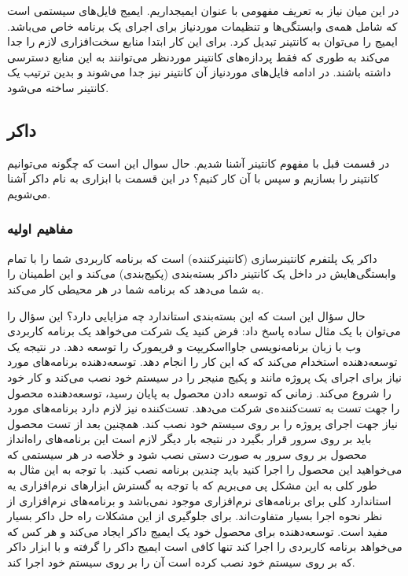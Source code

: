 در این میان نیاز به تعریف مفهومی با عنوان ایمیجداریم. ایمیج فایل‌های سیستمی است که شامل همه‌ی وابستگی‌ها و تنظیمات موردنیاز برای اجرای یک برنامه خاص می‌باشد. ایمیج را می‌توان به کانتینر تبدیل کرد. برای این کار ابتدا
منابع سخت‌افزاری لازم را جدا می‌کند به طوری که فقط پردازه‌های کانتینر موردنظر می‌توانند به این منابع دسترسی داشته باشند. در ادامه فایل‌های موردنیاز آن کانتینر نیز جدا می‌شوند و بدین ترتیب یک کانتینر ساخته می‌شود.


\subsection{داکر}

در قسمت قبل با مفهوم کانتینر آشنا شدیم. حال سوال این است که چگونه می‌توانیم کانتینر را بسازیم و سپس با آن کار کنیم؟ در این قسمت با ابزاری به نام داکر آشنا می‌شویم.

\subsubsection{مفاهیم اولیه}

داکر یک پلتفرم کانتینرسازی (کانتینرکننده) است که برنامه کاربردی شما را با تمام وابستگی‌هایش در داخل یک کانتینر داکر بسته‌بندی (پکیج‌بندی) می‌کند و این اطمینان را به شما می‌دهد که برنامه شما در هر محیطی کار می‌کند.

حال سؤال این است که این بسته‌بندی استاندارد چه مزایایی دارد؟ این سؤال را می‌توان با یک مثال ساده پاسخ داد: فرض کنید یک شرکت می‌خواهد یک برنامه کاربردی وب با زبان برنامه‌نویسی جاوااسکریپت و فریمورک
را توسعه دهد. در نتیجه یک توسعه‌دهنده استخدام می‌کند که که این کار را انجام دهد. توسعه‌دهنده برنامه‌های مورد نیاز برای اجرای یک پروژه مانند
و پکیج منیجر
را در سیستم خود نصب می‌کند و کار خود را شروع می‌کند. زمانی که توسعه دادن محصول به پایان رسید، توسعه‌دهنده محصول را جهت تست به تست‌کننده‌ی شرکت می‌دهد. تست‌کننده نیز لازم دارد برنامه‌های مورد نیاز جهت اجرای پروژه را بر روی سیستم خود نصب کند. همچنین بعد از تست محصول باید بر روی سرور قرار بگیرد در نتیجه بار دیگر لازم است این برنامه‌های راه‌انداز محصول بر روی سرور به صورت دستی نصب شود و خلاصه در هر سیستمی که می‌خواهید این محصول را اجرا کنید باید چندین برنامه نصب کنید. با توجه به این مثال به طور کلی به این مشکل پی می‌بریم که با توجه به گسترش ابزارهای نرم‌افزاری یه استاندارد کلی برای برنامه‌های نرم‌افزاری موجود نمی‌باشد و برنامه‌های نرم‌افزاری از نظر نحوه اجرا بسیار متفاوت‌اند.  برای جلوگیری از این مشکلات راه حل داکر بسیار مفید است. توسعه‌دهنده برای محصول خود یک ایمیج داکر ایجاد می‌کند و هر کس که می‌خواهد برنامه کاربردی را اجرا کند تنها کافی است ایمیج داکر را گرفته و با ابزار داکر که بر روی سیستم خود نصب کرده است آن را بر روی سیستم خود اجرا کند.

